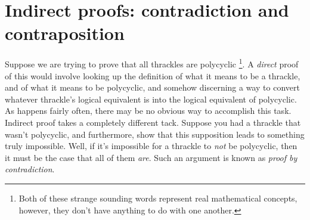 \documentclass[10pt,]{book}
\theoremstyle{plain}
\theoremstyle{definition}
\theoremstyle{definition}
\numberwithin{equation}{section}
\begin{document}
\section[{Indirect proofs: contradiction and contraposition}]{Indirect proofs: contradiction and contraposition}\label{sec_contra}

    Suppose we are trying to prove that all thrackles are polycyclic
    \footnote{Both of these strange sounding words represent real 
    mathematical concepts, however, they don't have anything to do 
    with one another.\label{fn-21}}.
    A \emph{direct} proof of this would involve looking up the definition
    of what it means to be a thrackle, and of what it means to be polycyclic,
    and somehow discerning a way to convert whatever thrackle's logical equivalent
    is into the logical equivalent of polycyclic. As happens fairly often,
    there may be no obvious way to accomplish this task.
    Indirect proof takes
    a completely different tack. Suppose you had a thrackle that wasn't
    polycyclic, and furthermore, show that this supposition leads to something
    truly impossible. Well, if it's impossible for a thrackle to \emph{not} be
    polycyclic, then it must be the case that all of them \emph{are}.
    Such an argument is known as 
    \emph{proof by contradiction}.
\par
\end{document}
